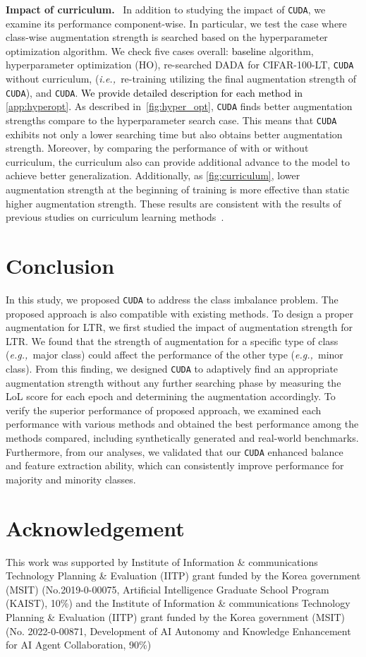 \documentclass{article}
\newcommand{\eg}{\emph{e.g.,~}}
\newcommand{\ie}{\emph{i.e.,~}}
\newcommand{\myparagraph}[1]{\vspace{0.07cm}\noindent\textbf{#1}~}
\def\code#1{\texttt{#1}}
\newcommand{\alg}{\code{CUDA}\xspace}
\renewcommand*\cite[1]{\citep{#1}}
\newcommand{\rebut}[1]{\textcolor{black}{#1}}
\begin{document}
\myparagraph{Impact of curriculum.} In addition to studying the impact of \alg, we examine its performance component-wise. In particular, we test the case where class-wise augmentation strength is searched based on the hyperparameter optimization algorithm. We check five cases overall: \rebut{baseline} algorithm, hyperparameter optimization (HO), re-searched DADA for CIFAR-100-LT, \alg without curriculum, (\ie re-training utilizing the final augmentation strength of \alg), and \alg. \rebut{We provide detailed description for each method in \autoref{app:hyperopt}.} As described in~\autoref{fig:hyper_opt}, \alg finds better augmentation strengths compare to the hyperparameter search case. This means that \alg exhibits not only a lower searching time but also obtains better augmentation strength. Moreover, by comparing the performance of with or without curriculum, the curriculum also can provide additional advance to the model to achieve better generalization. Additionally, as \autoref{fig:curriculum}, lower augmentation strength at the beginning of training is more effective than static higher augmentation strength. These results are consistent with the results of previous studies on curriculum learning methods~\cite{ zhou2020curriculum}. \section{Conclusion}
\label{sec:conclusion}
In this study, we proposed \alg to address the class imbalance problem. The proposed approach is also compatible with existing methods. To design a proper augmentation for LTR, we first studied the impact of augmentation strength for LTR. We found that the strength of augmentation for a specific type of class (\eg major class) could affect the performance of the other type (\eg minor class). From this finding, we designed \alg to adaptively find an appropriate augmentation strength without any further searching phase by measuring the LoL score for each epoch and determining the augmentation accordingly. To verify the superior performance of proposed approach, we examined each performance with various methods and obtained the best performance among the methods compared, including synthetically generated and real-world benchmarks. Furthermore, from our analyses, we validated that our \alg enhanced balance and feature extraction ability, which can consistently improve performance for majority and minority classes.

\section*{Acknowledgement}
This work was supported by Institute of Information \& communications Technology Planning \& Evaluation (IITP) grant funded by the Korea government (MSIT) (No.2019-0-00075, Artificial Intelligence Graduate School Program (KAIST), 10\%) and the Institute of Information \& communications Technology Planning \& Evaluation (IITP) grant funded by the Korea government (MSIT) (No. 2022-0-00871, Development of AI Autonomy and Knowledge Enhancement for AI Agent Collaboration, 90\%) 


\end{document}
